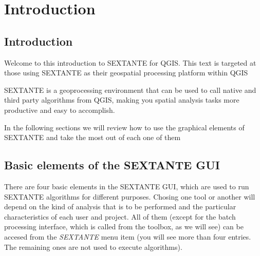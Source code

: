 \chapter{Introduction}

\section{Introduction}

Welcome to this introduction to SEXTANTE for QGIS. This text is targeted at those using SEXTANTE as their geospatial processing platform within QGIS

SEXTANTE is a geoprocessing environment that can be used to call native and third party algorithms from QGIS, making you spatial analysis tasks more productive and easy to accomplish.

In the following sections we will review how to use the graphical elements of SEXTANTE and take the most out of each one of them


\section{Basic elements of the SEXTANTE GUI}

There are four basic elements in the SEXTANTE GUI, which are used to run SEXTANTE algorithms for different purposes. Chosing one tool or another will depend on the kind of analysis that is to be performed and the particular characteristics of each user and project. All of them (except for the batch processing interface, which is called from the toolbox, as we will see) can be accesed from the \emph{SEXTANTE} menu item (you will see more than four entries. The remaining ones are not used to execute algorithms).

